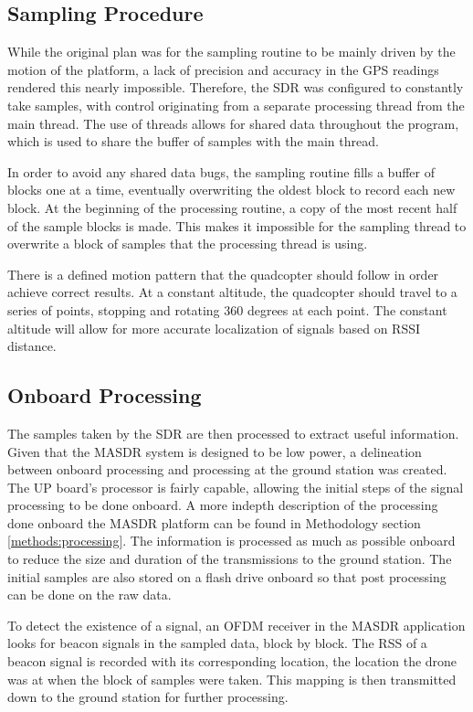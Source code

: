 {\subsection{Sampling Procedure} \label{impl:rotate}
While the original plan was for the sampling routine to be mainly driven by the motion of the platform, a lack of precision and accuracy in the GPS readings rendered this nearly impossible. Therefore, the SDR was configured to constantly take samples, with control originating from a separate processing thread from the main thread. The use of threads allows for shared data throughout the program, which is used to share the  buffer of samples with the main thread. \par
In order to avoid any shared data bugs, the sampling routine fills a buffer of blocks one at a time, eventually overwriting the oldest block to record each new block. At the beginning of the processing routine, a copy of the most recent half of the sample blocks is made. This makes it impossible for the sampling thread to overwrite a block of samples that the processing thread is using. \par
There is a defined motion pattern that the quadcopter should follow in order achieve correct results. At a constant altitude, the quadcopter should travel to a series of points, stopping and rotating 360 degrees at each point. The constant altitude will allow for more accurate localization of signals based on RSSI distance.
\subsection{Onboard Processing}
The samples taken by the SDR are then processed to extract useful information. Given that the MASDR system is designed to be low power, a delineation between onboard processing and processing at the ground station was created. The UP board’s processor is fairly capable, allowing the initial steps of the signal processing to be done onboard. A more indepth description of the processing done onboard the MASDR platform can be found in Methodology section \ref{methods:processing}. The information is processed as much as possible onboard to reduce the size and duration of the transmissions to the ground station. The initial samples are also stored on a flash drive onboard so that post processing can be done on the raw data. \par
To detect the existence of a signal, an OFDM receiver in the MASDR application looks for beacon signals in the sampled data, block by block. The RSS of a beacon signal is recorded with its corresponding location, the location the drone was at when the block of samples were taken. This mapping is then transmitted down to the ground station for further processing.
}
